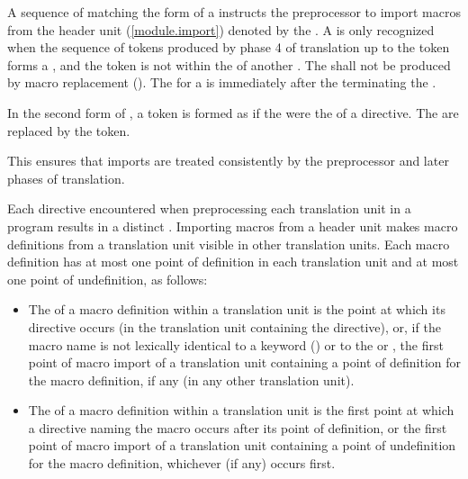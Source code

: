 \begin{std.txt}
\color{addclr}
\alinea
A sequence of  matching the form
of a 
instructs the preprocessor to import macros from the header unit
(\ref{module.import}) denoted by the .
A  is only recognized when the sequence of tokens
produced by phase 4 of translation up to the  token
forms a , and the  token is not
within the  of another .
The \tcode{;}  shall not be produced by
macro replacement ().
The  for a  is
immediately after the \tcode{;} terminating the .

\color{addclr}
\alinea
In the second form of ,
a  token is formed as if
the 
were the  of a  directive.
The  are replaced by
the  token.
\begin{note}
This ensures that imports are treated consistently by
the preprocessor and later phases of translation.
\end{note}

\color{addclr}
\alinea
Each  directive encountered when preprocessing
each translation unit in a program results in a distinct
.
Importing macros from a header unit makes macro definitions
from a translation unit visible in other translation units.
Each macro definition has at most one point of definition in
each translation unit and at most one point of undefinition, as follows:
\begin{itemize}
\item
The  of a macro definition within a translation unit
is the point at which its  directive occurs (in the translation
unit containing the  directive), or,
if the macro name is not lexically identical to a keyword ()
or to the   or ,
the first point
of macro import of a translation unit containing a point of definition for the
macro definition, if any (in any other translation unit).

\item
The  of a macro definition within a translation unit
is the first point at which a  directive naming the macro occurs
after its point of definition, or the first point
of macro import of a translation unit containing a point of undefinition for the
macro definition, whichever (if any) occurs first.
\end{itemize}


\end{std.txt}

